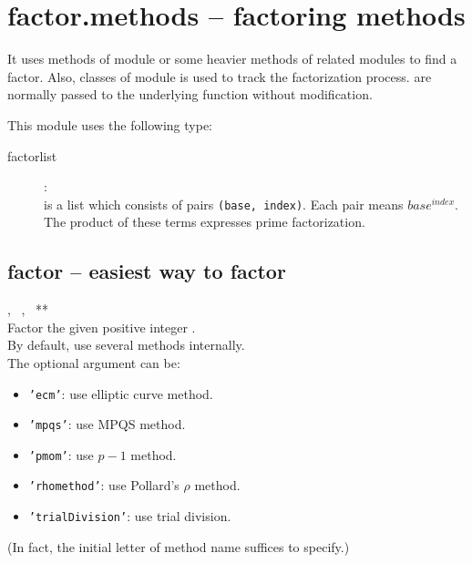 

 \section{factor.methods -- factoring methods}

It uses methods of  module
or some heavier methods of related modules to find a factor.
Also, classes of  module is used to track
the factorization process.
 are normally passed to the underlying function without modification.

 This module uses the following type:
 \begin{description}
   \item[factorlist]:\\
      is a list which consists of pairs {\tt (base, index)}.
     Each pair means \(base^{index}\).
     The product of these terms expresses prime factorization.
 \end{description}
%
  \subsection{factor -- easiest way to factor}
   {%
     ,\ %
     ,\ %
     **
   }{%
   }\\
   \spacing
   \quad Factor the given positive integer .\\
   \spacing
   \quad By default, use several methods internally.\\
   \spacing
   \quad The optional argument  can be:
   \begin{itemize}
   \item {\tt 'ecm'}: use elliptic curve method.
   \item {\tt 'mpqs'}: use MPQS method.
   \item {\tt 'pmom'}: use \(p-1\) method.
   \item {\tt 'rhomethod'}: use Pollard's \(\rho\) method.
   \item {\tt  'trialDivision'}: use trial division.
   \end{itemize}
   (\negok In fact, the initial letter of method name suffices to specify.)\\
%
